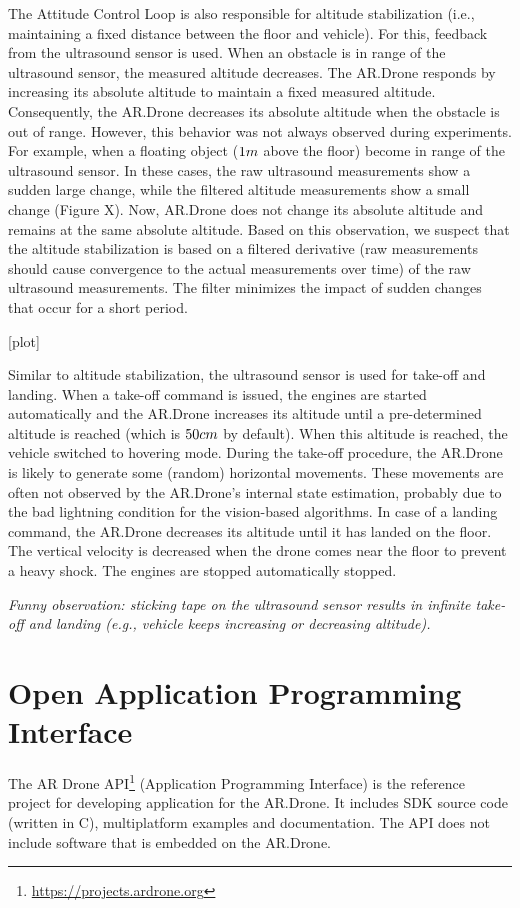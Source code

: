 The Attitude Control Loop is also responsible for altitude stabilization (i.e., maintaining a fixed distance between the floor and vehicle).
For this, feedback from the ultrasound sensor is used.
When an obstacle is in range of the ultrasound sensor, the measured altitude decreases.
The AR.Drone responds by increasing its absolute altitude to maintain a fixed measured altitude.
Consequently, the AR.Drone decreases its absolute altitude when the obstacle is out of range.
However, this behavior was not always observed during experiments.
For example, when a floating object ($1\small{m}$ above the floor) become in range of the ultrasound sensor.
In these cases, the raw ultrasound measurements show a sudden large change, while the filtered altitude measurements show a small change (Figure X).
Now, AR.Drone does not change its absolute altitude and remains at the same absolute altitude.
Based on this observation, we suspect that the altitude stabilization is based on a filtered derivative \small{(raw measurements should cause convergence to the actual measurements over time)} of the raw ultrasound measurements.
The filter minimizes the impact of sudden changes that occur for a short period.

[plot]

Similar to altitude stabilization, the ultrasound sensor is used for take-off and landing.
When a take-off command is issued, the engines are started automatically and the AR.Drone increases its altitude until a pre-determined altitude is reached (which is $50\small{cm}$ by default). When this altitude is reached, the vehicle switched to hovering mode.
During the take-off procedure, the AR.Drone is likely to generate some (random) horizontal movements.
These movements are often not observed by the AR.Drone's internal state estimation, probably due to the bad lightning condition for the vision-based algorithms.
In case of a landing command, the AR.Drone decreases its altitude until it has landed on the floor. The vertical velocity is decreased when the drone comes near the floor to prevent a heavy shock.
The engines are stopped automatically stopped.

\textit{Funny observation: sticking tape on the ultrasound sensor results in infinite take-off and landing (e.g., vehicle keeps increasing or decreasing altitude).}


\section{Open Application Programming Interface}
The AR Drone API\footnote{\url{https://projects.ardrone.org}} (Application Programming Interface) is the reference project for developing application for the AR.Drone.
It includes SDK source code (written in C), multiplatform examples and documentation.
The API does not include software that is embedded on the AR.Drone.

